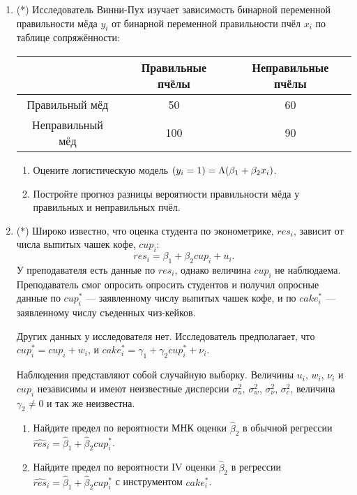 \documentclass[12pt]{article}
\let\P\relax
\DeclareMathOperator{\P}{\mathbb{P}}
\begin{document}
\begin{enumerate}
    
\newpage
    \item (*) Исследователь Винни-Пух изучает зависимость бинарной переменной правильности мёда $y_i$ 
    от бинарной переменной правильности пчёл $x_i$ по таблице сопряжённости:

    \begin{tabular}{ccc}
        \toprule 
         & Правильные пчёлы & Неправильные пчёлы \\
        \midrule
        Правильный мёд & 50 & 60 \\
        Неправильный мёд & 100 & 90 \\
        \bottomrule
    \end{tabular}
    
    \begin{enumerate}
        \item Оцените логистическую модель $\P(y_i = 1) = \Lambda(\beta_1 + \beta_2 x_i)$. 
        \item Постройте прогноз разницы вероятности правильности мёда у правильных и неправильных пчёл. 
    \end{enumerate}

\item (*) Широко известно, что оценка студента по эконометрике, $res_i$, зависит от числа выпитых чашек кофе, $cup_i$:
\[
res_i = \beta_1 + \beta_2 cup_i + u_i.
\]
У преподавателя есть данные по $res_i$, однако величина $cup_i$ не наблюдаема. 
Преподаватель смог опросить опросить студентов и получил опросные данные по $cup_i^*$ —
заявленному числу выпитых чашек кофе, и по $cake_i^*$ — заявленному числу съеденных чиз-кейков. 

Других данных у исследователя нет. Исследователь предполагает, что $cup_i^* = cup_i + w_i$, и
$cake_i^* = \gamma_1 + \gamma_2 cup^*_i + \nu_i$. 


Наблюдения представляют собой случайную выборку. 
Величины $u_i$, $w_i$, $\nu_i$ и $cup_i$ независимы и имеют неизвестные дисперсии $\sigma^2_u$, $\sigma^2_w$,
$\sigma^2_{\nu}$, $\sigma^2_c$, величина $\gamma_2 \neq 0$ и так же неизвестна. 



\begin{enumerate}
    \item Найдите предел по вероятности МНК оценки $\hat\beta_2$ 
    в обычной регрессии $\widehat{res}_i = \hat\beta_1 + \hat\beta_2 cup_i^*$. 

    \item Найдите предел по вероятности IV оценки $\hat\beta_2$ 
    в регрессии $\widehat{res}_i = \hat\beta_1 + \hat\beta_2 cup_i^*$ с инструментом $cake_i^*$.
\end{enumerate}


\end{enumerate}
\end{document}
